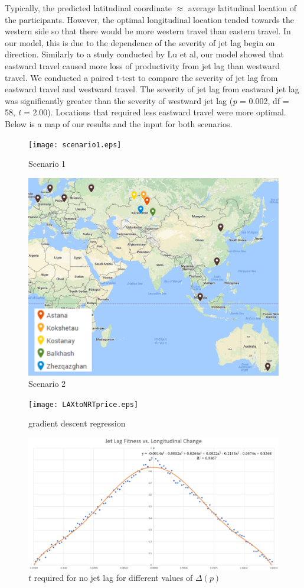 	Typically, the predicted latitudinal coordinate $\approx$ average latitudinal location of the participants. However, the optimal longitudinal location tended towards the western side so that there would be more western travel than eastern travel. In our model, this is due to the dependence of the severity of jet lag begin on direction. Similarly to a study conducted by Lu et al, our model showed that eastward travel caused more loss of productivity from jet lag than westward travel. We conducted a paired t-test to compare the severity of jet lag from eastward travel and westward travel. The severity of jet lag from eastward jet lag was significantly greater than the severity of westward jet lag (\textit{p} = 0.002, df = 58, \textit{t} = 2.00). Locations that required less eastward travel were more optimal. 
	Below is a map of our results and the input for both scenarios. 
\begin{figure}
\texttt{[image: scenario1.eps]}
\caption{Scenario 1}
\end{figure}

\begin{figure}
\includegraphics[width=\textwidth]{scenario2.eps}
\caption{Scenario 2}
\end{figure}

\begin{figure}[h!]
\texttt{[image: LAXtoNRTprice.eps]}
\caption{gradient descent regression}
\end{figure}

\begin{figure}[h!]
	\includegraphics[width=\textwidth]{kuramotofitnessgraph.eps}
	\caption{$t$ required for no jet lag for different values of $\Delta(p)$}
\end{figure}	

